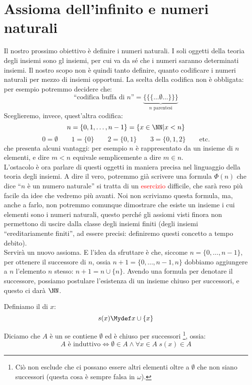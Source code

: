 \documentclass[11pt]{scrartcl}
\begin{document}
\section{Assioma dell'infinito e numeri naturali}
Il nostro prossimo obiettivo è definire i numeri naturali. I soli oggetti della teoria degli insiemi sono gl insiemi, per cui va da sé che 
i numeri saranno determinati insiemi. Il nostro scopo non è quindi tanto definire, quanto codificare i numeri naturali per mezzo di insiemi opportuni.
La scelta della codifica non è obbligata: per esempio potremmo decidere che:
\[ \text{``codifica buffa di $n$''} = \underbrace{\{\{\{\ldots \emptyset\ldots\}\}\}}_{\text{$n$ parentesi}}
	\]
Sceglieremo, invece, quest'altra codifica:
\[ n = \{0,1,\ldots,n-1\} = \{x \in \NN | x < n\}
	\]\[ 0 = \emptyset \qquad 1 = \{0\} \qquad 2 = \{0,1\} \qquad 3 = \{0,1,2\} \qquad \text{etc.}
		\]
che presenta alcuni vantaggi: per esempio $n$ è rappresentato da un insieme di $n$ elementi, e dire $m < n$ equivale semplicemente a dire $m \in n$.\\
L'ostacolo è ora parlare di questi oggetti in maniera precisa nel linguaggio della teoria degli insiemi. A dire il vero, potremmo già scrivere una formula $\Phi(n)$ che dice 
``$n$ è un numero naturale'' si tratta di un \textcolor{red}{esercizio} difficile, che sarà reso più facile da idee che vedremo più avanti. Noi non scriviamo questa formula, ma, anche a farlo,
non potremmo comunque dimostrare che esiste un insieme i cui elementi sono i numeri naturali, questo perché gli assiomi visti finora non permettono di uscire dalla classe degli insiemi finiti (degli insiemi ``ereditariamente finiti'',
ad essere precisi: definiremo questi concetto a tempo debito).\\
Servirà un nuovo assioma. E l'idea da sfruttare è che, siccome $n = \{0,\ldots,n-1\}$, per ottenere il successore di $n$, ossia $n+1 = \{0,\ldots,n-1,n\}$ dobbiamo aggiungere a $n$ l'elemento $n$ stesso: $n+1 = n \cup \{n\}$.
Avendo una formula per denotare il successore, possiamo postulare l'esistenza di un insieme chiuso per successori, e questo ci darà $\NN$.

\begin{definition}
	[Successore]
	Definiamo il  di $x$:
	\[ s(x) \Mydef x \cup \{x\}
		\]
\end{definition}

\begin{definition}
	Diciamo che $A$ è un  se contiene $\emptyset$ ed è chiuso per successori \footnote{Ciò non esclude che ci possano essere altri elementi oltre a $\emptyset$ che non siano successori (questa cosa è sempre falsa in $\omega$).}, ossia:
	\[ \text{$A$ è induttivo} \iff \emptyset \in A \land \forall x \in A \; s(x) \in A
		\]
\end{definition}
\end{document}
